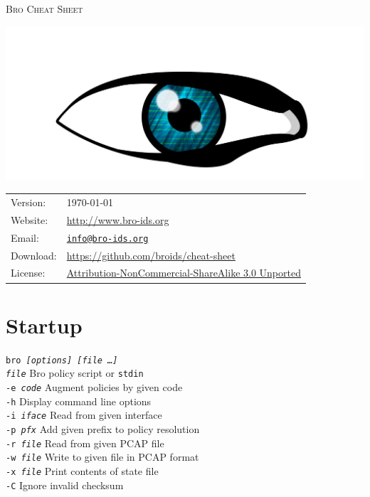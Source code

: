 \documentclass[10pt,landscape]{article}
\begin{document}
\begin{multicols*}{3}

{\Huge\scshape Bro Cheat Sheet}

\hfill\includegraphics[width=.4\linewidth]{bro-logo-small}
\vspace{-38pt}

{\scriptsize
{}
\begin{tabular}{l l}
Version: & \today\\
Website: & \url{http://www.bro-ids.org}\\
Email: & \texttt{\href{mailto:info@bro-ids.org}{info@bro-ids.org}}\\
Download: & \url{https://github.com/broids/cheat-sheet}\\
License: & \href{http://creativecommons.org/licenses/by-nc-sa/3.0/}
                {Attribution-NonCommercial-ShareAlike 3.0 Unported}
\end{tabular}
}


\vspace{-10pt}

\section*{Startup}

\texttt{bro \textit{[options] [file \dots]}}\\
\texttt{\textit{file}} \dotfill Bro policy script or \texttt{stdin}\\
\texttt{-e \textit{code}} \dotfill Augment policies by given code\\
\texttt{-h} \dotfill Display command line options\\
\texttt{-i \textit{iface}} \dotfill Read from given interface\\
\texttt{-p \textit{pfx}} \dotfill Add given prefix to policy resolution\\
\texttt{-r \textit{file}} \dotfill Read from given PCAP file\\
\texttt{-w \textit{file}} \dotfill Write to given file in PCAP format\\
\texttt{-x \textit{file}} \dotfill Print contents of state file\\
\texttt{-C} \dotfill Ignore invalid checksum


\end{multicols*}
\end{document}
